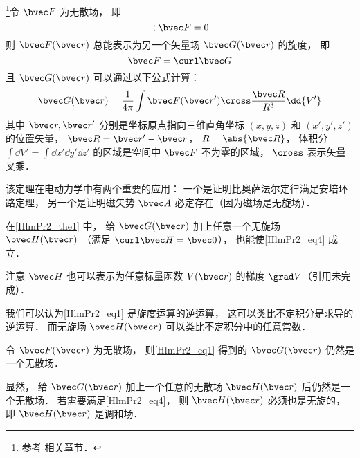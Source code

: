 
\begin{issues}
\issueTODO
\end{issues}


\begin{theorem}{}\label{HlmPr2_the1}
\footnote{参考 \cite{GriffE} 相关章节．}令 $\bvec F$ 为无散场， 即
\begin{equation}
\div \bvec F = 0
\end{equation}
则 $\bvec F(\bvec r)$ 总能表示为另一个矢量场 $\bvec G(\bvec r)$ 的旋度， 即
\begin{equation}\label{HlmPr2_eq4}
\bvec F = \curl \bvec G
\end{equation}
且 $\bvec G(\bvec r)$ 可以通过以下公式计算：
\begin{equation}\label{HlmPr2_eq1}
\bvec G(\bvec r) = \frac{1}{4\pi}\int \bvec F(\bvec r') \cross \frac{\bvec R}{R^3} \dd{V'}
\end{equation}
其中 $\bvec r, \bvec r'$ 分别是坐标原点指向三维直角坐标 $(x, y, z)$ 和 $(x', y', z')$ 的位置矢量， $\bvec R = \bvec r' - \bvec r$， $R = \abs{\bvec R}$， 体积分 $\int\dd{V'} = \int\dd{x'}\dd{y'}\dd{z'}$ 的区域是空间中 $\bvec F$ 不为零的区域， $\cross$ 表示矢量叉乘．
\end{theorem}

该定理在电动力学中有两个重要的应用： 一个是证明比奥萨法尔定律满足安培环路定理， 另一个是证明磁矢势 $\bvec A$ 必定存在（因为磁场是无旋场）．

\begin{corollary}{}
在\autoref{HlmPr2_the1} 中， 给 $\bvec G(\bvec r)$ 加上任意一个无旋场 $\bvec H(\bvec r)$ （满足 $\curl \bvec H = \bvec 0$）， 也能使\autoref{HlmPr2_eq4} 成立．
\end{corollary}
注意 $\bvec H$ 也可以表示为任意标量函数 $V(\bvec r)$ 的梯度 $\grad V$（引用未完成）．

我们可以认为\autoref{HlmPr2_eq1} 是旋度运算的逆运算， 这可以类比不定积分是求导的逆运算． 而无旋场 $\bvec H(\bvec r)$ 可以类比不定积分中的任意常数．

\begin{theorem}{}
令 $\bvec F(\bvec r)$ 为无散场， 则\autoref{HlmPr2_eq1} 得到的 $\bvec G(\bvec r)$ 仍然是一个无散场．
\end{theorem}
显然， 给 $\bvec G(\bvec r)$ 加上一个任意的无散场 $\bvec H(\bvec r)$ 后仍然是一个无散场． 若需要满足\autoref{HlmPr2_eq4}， 则 $\bvec H(\bvec r)$ 必须也是无旋的， 即 $\bvec H(\bvec r)$ 是调和场．

